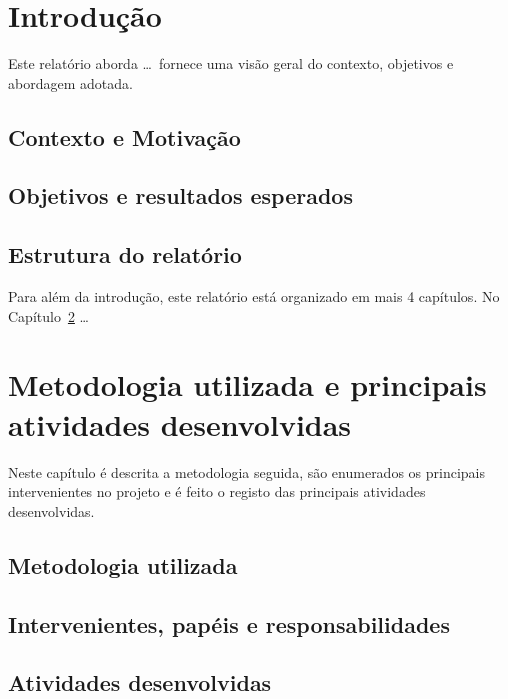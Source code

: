 \documentclass[11pt,a4paper]{report}
\begin{document}
\chapter{Introdução}

\pagestyle{fancy}
\setcounter{page}{1}

Este relatório aborda \ldots\ fornece uma visão geral do contexto, objetivos e abordagem adotada.

\section{Contexto e Motivação}

\section{Objetivos e resultados esperados}

\section{Estrutura do relatório}

Para além da introdução, este relatório está organizado em mais 4 capítulos.
No Capítulo~\ref{chap:metodo} \ldots


\chapter{Metodologia utilizada e principais atividades desenvolvidas}\label{chap:metodo}

Neste capítulo é descrita a metodologia seguida, são enumerados os
principais intervenientes no projeto e é feito o registo das
principais atividades desenvolvidas.

\section{Metodologia utilizada}

\section{Intervenientes, papéis e responsabilidades}

\section{Atividades desenvolvidas}
\end{document}
